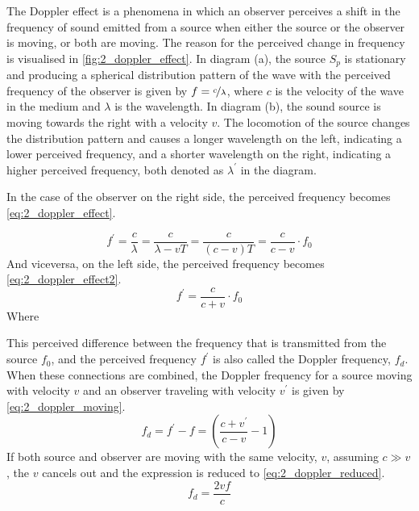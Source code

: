 The Doppler effect is a phenomena in which an observer perceives a shift in the frequency of sound emitted from a source when either the source or the observer is moving, or both are moving. The reason for the perceived change in frequency is visualised in \cref{fig:2_doppler_effect}. In diagram (a), the source $S_{p}$ is stationary and producing a spherical distribution pattern of the wave with the perceived frequency of the observer is given by $f=\nicefrac{c}{\lambda}$, where $c$ is the velocity of the wave in the medium and $\lambda$ is the wavelength. In diagram (b), the sound source is moving towards the right with a velocity $v$. The locomotion of the source changes the distribution pattern and causes a longer wavelength on the left, indicating a lower perceived frequency, and a shorter wavelength on the right, indicating a higher perceived frequency, both denoted as $\lambda^{\prime}$ in the diagram.

In the case of the observer on the right side, the perceived frequency becomes \cref{eq:2_doppler_effect}.

\begin{equation} \label{eq:2_doppler_effect}
	f^{\prime} = \frac{c}{\lambda} = \frac{c}{\lambda - v T} = \frac{c}{(c-v)T} = \frac{c}{c-v}\cdot f_{0}
\end{equation}
And viceversa, on the left side, the perceived frequency becomes \cref{eq:2_doppler_effect2}.
\begin{equation} \label{eq:2_doppler_effect2}
	f^{\prime} = \frac{c}{c+v} \cdot f_{0}
\end{equation}
Where 

This perceived difference between the frequency that is transmitted from the source $f_{0}$, and the perceived frequency $f^{\prime}$ is also called the Doppler frequency, $f_{d}$. When these connections are combined, the Doppler frequency for a source moving with velocity $v$ and an observer traveling with velocity $v^{\prime}$ is given by \cref{eq:2_doppler_moving}.
\begin{equation} \label{eq:2_doppler_moving}
	f_{d} = f^{\prime} - f = \left( \frac{c + v^{\prime}}{c - v}-1 \right)
\end{equation}
If both source and observer are moving with the same velocity, $v$, assuming $c\gg v$, the $v$ cancels out and the expression is reduced to \cref{eq:2_doppler_reduced}.
\begin{equation} \label{eq:2_doppler_reduced}
	f_{d} = \frac{2 v f}{c}
\end{equation}

